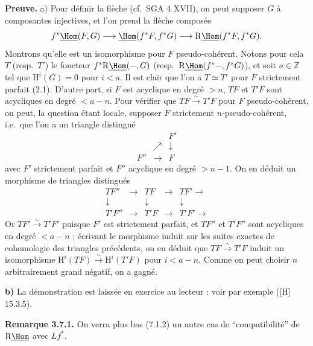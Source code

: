 \textbf{Preuve.} a) Pour définir la flèche (cf.\ SGA 4 XVII), on peut supposer $G$ à composantes injectives, et l'on prend la flèche composée
\[
f^* \underline{\Hom}(F, G) \longrightarrow \underline{\Hom}(f^*F, f^*G) \longrightarrow \mathrm{R}\underline{\Hom}(f^*F, f^*G).
\]
Montrons qu'elle est un isomorphisme pour $F$ pseudo-cohérent. Notons pour cela $T$ (resp.\ $T'$) le foncteur $f^* \mathrm{R}\underline{\Hom}(-, G)$ (resp.\ $\mathrm{R}\underline{\Hom}(f^*-, f^*G)$), et soit $a \in \mathbb{Z}$ tel que $\mathrm{H}^i(G) = 0$ pour $i < a$. Il est clair que l'on a $T \simeq T'$ pour $F$ strictement parfait (2.1). D'autre part, si $F$ est acyclique en degré $> n$, $TF$ et $T'F$ sont acycliques en degré $< a-n$. Pour vérifier que $TF \xrightarrow{\sim} T'F$ pour $F$ pseudo-cohérent, on peut, la question étant locale, supposer $F$ strictement $n$-pseudo-cohérent, i.e.\ que l'on a un triangle distingué
\[
\begin{array}{ccc}
& & F' \\
& \nearrow & \downarrow \\
F'' & \longrightarrow & F
\end{array}
\]
avec $F'$ strictement parfait et $F''$ acyclique en degré $> n-1$. On en déduit un morphisme de triangles distingués
\[
\begin{array}{ccccc}
TF'' & \longrightarrow & TF & \longrightarrow & TF' \longrightarrow \\
\downarrow & & \downarrow & & \downarrow \\
T'F'' & \longrightarrow & T'F & \longrightarrow & T'F' \longrightarrow
\end{array}
\]
Or $TF' \xrightarrow{\sim} T'F'$ puisque $F'$ est strictement parfait, et $TF''$ et $T'F''$ sont acycliques en degré $< a-n$ ; écrivant le morphisme induit sur les suites exactes de cohomologie des triangles précédents, on en déduit que $TF \xrightarrow{\sim} T'F$ induit un isomorphisme $\mathrm{H}^i(TF) \xrightarrow{\sim} \mathrm{H}^i(T'F)$ pour $i < a-n$. Comme on peut choisir $n$ arbitrairement grand négatif, on a gagné.

\textbf{b)} La démonstration est laissée en exercice au lecteur : voir par exemple ([H] 15.3.5).

\textbf{Remarque 3.7.1.} On verra plus bas (7.1.2) un autre cas de ``compatibilité'' de $\mathrm{R}\underline{\Hom}$ avec $Lf^*$.

